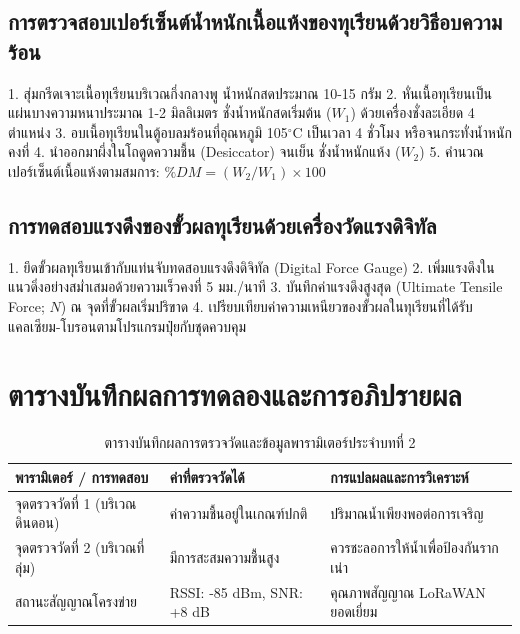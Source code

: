 \subsection{การตรวจสอบเปอร์เซ็นต์น้ำหนักเนื้อแห้งของทุเรียนด้วยวิธีอบความร้อน}
\begin{sensorbox}
1. สุ่มกรีดเจาะเนื้อทุเรียนบริเวณกึ่งกลางพู น้ำหนักสดประมาณ 10-15 กรัม
2. หั่นเนื้อทุเรียนเป็นแผ่นบางความหนาประมาณ 1-2 มิลลิเมตร ชั่งน้ำหนักสดเริ่มต้น ($W_1$) ด้วยเครื่องชั่งละเอียด 4 ตำแหน่ง
3. อบเนื้อทุเรียนในตู้อบลมร้อนที่อุณหภูมิ 105$^{\circ}$C เป็นเวลา 4 ชั่วโมง หรือจนกระทั่งน้ำหนักคงที่
4. นำออกมาผึ่งในโถดูดความชื้น (Desiccator) จนเย็น ชั่งน้ำหนักแห้ง ($W_2$)
5. คำนวณเปอร์เซ็นต์เนื้อแห้งตามสมการ: $\%DM = (W_2 / W_1) \times 100$
\end{sensorbox}

\subsection{การทดสอบแรงดึงของขั้วผลทุเรียนด้วยเครื่องวัดแรงดิจิทัล}
\begin{sensorbox}
1. ยึดขั้วผลทุเรียนเข้ากับแท่นจับทดสอบแรงดึงดิจิทัล (Digital Force Gauge)
2. เพิ่มแรงดึงในแนวดิ่งอย่างสม่ำเสมอด้วยความเร็วคงที่ 5 มม./นาที
3. บันทึกค่าแรงดึงสูงสุด (Ultimate Tensile Force; $N$) ณ จุดที่ขั้วผลเริ่มปริขาด
4. เปรียบเทียบค่าความเหนียวของขั้วผลในทุเรียนที่ได้รับแคลเซียม-โบรอนตามโปรแกรมปุ๋ยกับชุดควบคุม
\end{sensorbox}

\section{ตารางบันทึกผลการทดลองและการอภิปรายผล}
\begin{table}[H]
\centering\small
\caption{ตารางบันทึกผลการตรวจวัดและข้อมูลพารามิเตอร์ประจำบทที่ 2}
\label{tab:ch02_datasheet}
\begin{tabularx}{\textwidth}{p{} p{} X}
\toprule
\textbf{พารามิเตอร์ / การทดสอบ} & \textbf{ค่าที่ตรวจวัดได้} & \textbf{การแปลผลและการวิเคราะห์} \\
\midrule
จุดตรวจวัดที่ 1 (บริเวณดินดอน) & ค่าความชื้นอยู่ในเกณฑ์ปกติ & ปริมาณน้ำเพียงพอต่อการเจริญ \\
จุดตรวจวัดที่ 2 (บริเวณที่ลุ่ม) & มีการสะสมความชื้นสูง & ควรชะลอการให้น้ำเพื่อป้องกันรากเน่า \\
สถานะสัญญาณโครงข่าย & RSSI: -85 dBm, SNR: +8 dB & คุณภาพสัญญาณ LoRaWAN ยอดเยี่ยม \\
\bottomrule
\end{tabularx}
\end{table}

